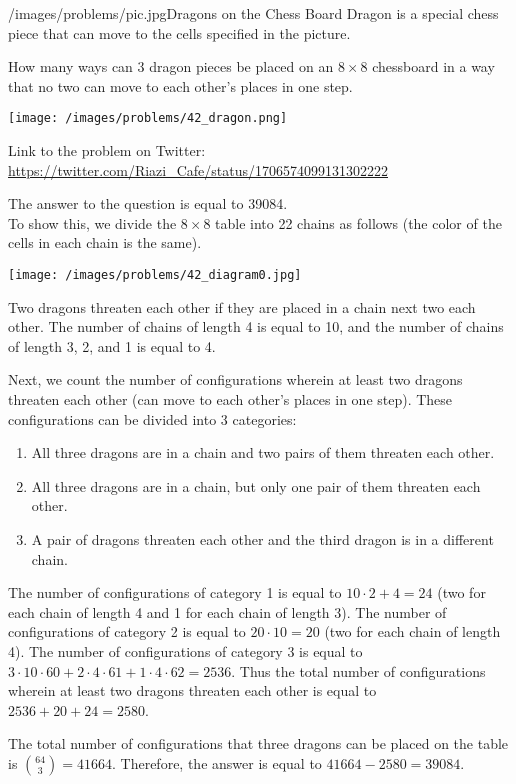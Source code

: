\begin{problem}{/images/problems/pic.jpg}{Dragons on the Chess Board}
	Dragon is a special chess piece that can move to the cells specified in the picture.

How many ways can 3 dragon pieces be placed on an $8\times8$ chessboard in a way that no two can move to each other's places in one step.

\begin{center}
	\texttt{[image: /images/problems/42\_dragon.png]}
\end{center}


Link to the problem on Twitter:  \url{https://twitter.com/Riazi_Cafe/status/1706574099131302222}
\end{problem}
\begin{solution}
The answer to the question is equal to 39084.\\[0.2cm]

To show this, we divide the $8 \times 8$ table into 22 chains as follows (the color of the cells in each chain is the same).

\begin{center}
	\texttt{[image: /images/problems/42\_diagram0.jpg]}
\end{center}

Two dragons threaten each other if they are placed in a chain next two each other.
The number of chains of length 4 is equal to 10, and the number of chains of length 3, 2, and 1 is equal to 4.

Next, we count the number of configurations wherein at least two dragons threaten each other (can move to each other's places in one step). These configurations can be divided into 3 categories:

\begin{enumerate}
\item All three dragons are in a chain and two pairs of them threaten each other.
\item All three dragons are in a chain, but only one pair of them threaten each other.
\item A pair of dragons threaten each other and the third dragon is in a different chain.
\end{enumerate}

The number of configurations of category 1 is equal to $10 \cdot 2 + 4 = 24$ (two for each chain of length 4 and 1 for each chain of length 3).
The number of configurations of category 2 is equal to $20 \cdot 10 = 20$ (two for each chain of length 4).
The number of configurations of category 3 is equal to $3 \cdot 10 \cdot 60 + 2 \cdot 4 \cdot 61 + 1 \cdot 4 \cdot 62 = 2536$.
Thus the total number of configurations wherein at least two dragons threaten each other is equal to $2536 + 20 + 24 = 2580$.

The total number of configurations that three dragons can be placed on the table is $\binom{64}{3} = 41664$.
Therefore, the answer is equal to $41664 - 2580 = 39084$.

\end{solution}